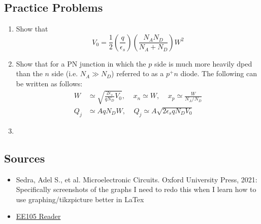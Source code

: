 \subsection{Practice Problems}
\begin{enumerate}
    \item Show that 
        \[V_0 = \frac12 (\frac{q}{\epsilon_s})(\frac{N_A N_D}{N_A + N_D}) W^2\]
    \item Show that for a PN junction in which the $p$ side is much more heavily dped than the $n$ side (i.e. $N_A \gg N_D$) referred to as a $p^+ n$ diode. The following can be written as follows:
        \begin{align*}
            W &\simeq \sqrt{\frac{2 \epsilon_s}{q N_D}V_0}, ~~~~~ x_n \simeq W, ~~~~~ x_p \simeq \frac{W}{N_A / N_D} \\
            Q_j &\simeq A q N_D W, ~~~~~ Q_j \simeq A \sqrt{2 \epsilon_s q N_D V_0}
        \end{align*}
    
    \item 
\end{enumerate}

\subsection{Sources}
\begin{itemize}
    \item Sedra, Adel S., et al. Microelectronic Circuits. Oxford University Press, 2021: Specifically screenshots of the graphs I need to redo this when I learn how to use graphing/tikzpicture better in LaTex
    \item \href{https://file.notion.so/f/f/048d6522-202b-48d4-b5d9-bc005bd602e2/214bf1f0-292f-48d6-9016-737d9f5da155/ee105_reader_v3.pdf?id=237a4300-3dbe-47d1-888b-ffae90d8352b&table=block&spaceId=048d6522-202b-48d4-b5d9-bc005bd602e2&expirationTimestamp=1714435200000&signature=yx-H1qvZJIodPfazOpwXX0Ce2mWMG8skOHl45xoPxus&downloadName=ee105_reader_v3.pdf}{EE105 Reader}
\end{itemize}
